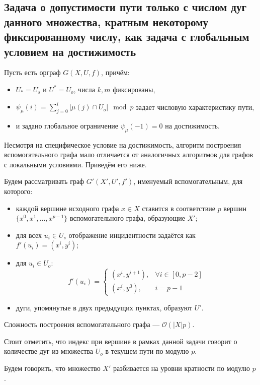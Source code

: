 \subsection{Задача о допустимости пути только с числом дуг данного множества, кратным некоторому фиксированному числу, как задача с глобальным условием на достижимость}

Пусть есть орграф $G(X,U,f)$, причём:
\begin{itemize}
	\item $U_* = U_s$ и $U^* = U_o$, числа $k, m$ фиксированы,
	\item $\psi_\mu(i) = \sum_{j=0}^i | \mu(j) \cap U_o | \mod p$ задает числовую характеристику пути, 
	\item и задано глобальное ограничение $\psi_\mu(-1) = 0$ на достижимость.
\end{itemize}

Несмотря на специфическое условие на достижимость, алгоритм построения вспомогательного графа мало отличается от аналогичных алгоритмов для графов с локальными условиями. Приведём его ниже.

Будем рассматривать граф $G'(X',U',f')$, именуемый вспомогательным, для которого: 
\begin{itemize}
	\item каждой вершине исходного графа $x \in X$ ставится в соответствие $p$ вершин $\{x^0, x^1, ... , x^{p-1} \}$ вспомогательного графа, образующие $X'$;
	\item для всех $u_i \in U_s$ отображение инцидентности задаётся как $f'(u_i) = (x^i, y^i)$;
	\item для $u_i \in U_o$:
	\begin{equation*}
	f'(u_i) = 
	\begin{cases}
	(x^i, y^{i+1}), &\text{$\forall i \in [0, p-2]$}\\
	(x^i, y^0), &\text{$i = p-1$}
	\end{cases}
	\end{equation*}
	\item дуги, упомянутые в двух предыдущих пунктах, образуют $U'$.
\end{itemize}

Сложность построения вспомогательного графа --- $\mathcal{O}(|X|p)$.

Стоит отметить, что индекс при вершине в рамках данной задачи говорит о количестве дуг из множества $U_o$ в текущем пути по модулю $p$. 

\begin{definition}
	Будем говорить, что множество $X'$ разбивается на уровни кратности по модулю $p$.
\end{definition}

